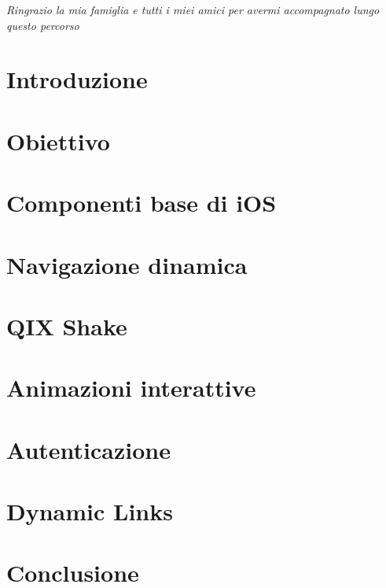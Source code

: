 \documentclass[12pt,a4paper]{book}
\newcommand{\intentblankpage}{
    \newpage
    \null
    \vfill
    \thispagestyle{empty}
    \newpage
}
\begin{document}
    
    \intentblankpage
    
    \vspace*{50mm}

    \vspace*{50mm}
    \begin{flushright}
        \textit{\large Ringrazio la mia famiglia e tutti i miei amici per avermi accompagnato lungo questo percorso}
    \end{flushright}
    
    \newpage
    
    \tableofcontents
    
    \chapter*{Introduzione}
    
    
    \chapter{Obiettivo}
    \label{CH:1}
    
    
    \chapter{Componenti base di iOS }
    \label{CH:2}
    

    \chapter{Navigazione dinamica}
    \label{CH:3}
    

    \chapter{QIX Shake}
    \label{CH:4}
    
    
    \chapter{Animazioni interattive}
    \label{CH:5}
    

    \chapter{Autenticazione}
    \label{CH:6}
    
    
    \chapter{Dynamic Links}
    \label{CH:7}
    
    
    \chapter*{Conclusione}
    \label{CH:Concl}
    
    
    
    
    
    \listoffigures
\end{document}
